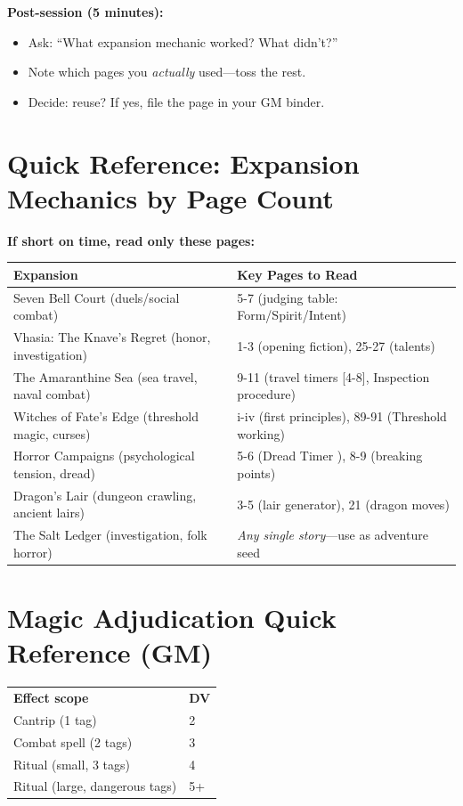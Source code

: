 \textbf{Post-session (5 minutes):}
\begin{itemize}
  \item Ask: ``What expansion mechanic worked? What didn't?''
  \item Note which pages you \textit{actually} used---toss the rest.
  \item Decide: reuse? If yes, file the page in your GM binder.
\end{itemize}

\section{Quick Reference: Expansion Mechanics by Page Count}
\textbf{If short on time, read only these pages:}
\begin{longtable}{l|l}
\hline
\textbf{Expansion} & \textbf{Key Pages to Read} \\
\hline
Seven Bell Court (duels/social combat) & 5-7 (judging table: Form/Spirit/Intent) \\
\hline
Vhasia: The Knave's Regret (honor, investigation) & 1-3 (opening fiction), 25-27 (talents) \\
\hline
The Amaranthine Sea (sea travel, naval combat) & 9-11 (travel timers [4-8], Inspection procedure) \\
\hline
Witches of Fate's Edge (threshold magic, curses) & i-iv (first principles), 89-91 (Threshold working) \\
\hline
Horror Campaigns (psychological tension, dread) & 5-6 (Dread Timer ), 8-9 (breaking points) \\
\hline
Dragon's Lair (dungeon crawling, ancient lairs) & 3-5 (lair generator), 21 (dragon moves) \\
\hline
The Salt Ledger (investigation, folk horror) & \textit{Any single story}---use as adventure seed \\
\hline
\end{longtable}

\section*{Magic Adjudication Quick Reference (GM)}
\label{sec:gm-magic-cheat}
\begin{tcolorbox}[colback=red!5!white,colframe=red!75!black,title=Default Magic DV,breakable]
\centering
\begin{tabular}{ll}
\textbf{Effect scope} & \textbf{DV} \\
Cantrip (1 tag) & 2 \\
Combat spell (2 tags) & 3 \\
Ritual (small, 3 tags) & 4 \\
Ritual (large, dangerous tags) & 5+ \\
\end{tabular}
\end{tcolorbox}

